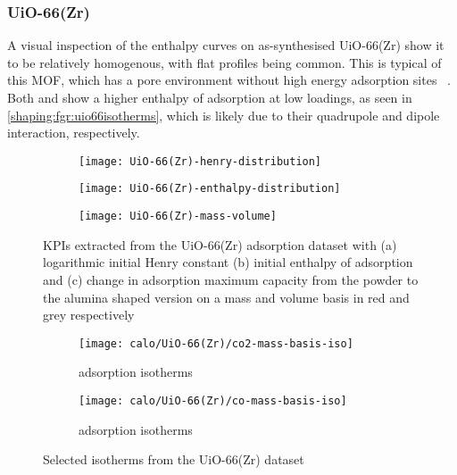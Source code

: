 
\subsubsection{UiO-66(Zr)}

A visual inspection of the enthalpy curves on as-synthesised UiO-66(Zr)
show it to be relatively homogenous, with flat
profiles being common. This is typical of this MOF, which has
a pore environment without high energy adsorption sites
~\cite{wiersumEvaluationUiO66GasBased2011}.
Both  and  show a higher enthalpy of adsorption
at low loadings, as seen in \autoref{shaping:fgr:uio66isotherms},
which is likely due to their quadrupole and dipole interaction,
respectively.

\begin{figure}[p!]
	\centering
	\begin{subfigure}{\linewidth}
		\parbox[c]{0.1\linewidth}{\caption{}%
			\label{shaping:fgr:analysisuio66henry}}%
		\parbox[b]{0.8\linewidth}{%
			\texttt{[image: UiO-66(Zr)-henry-distribution]}%
		}%
	\end{subfigure}

	\begin{subfigure}{\linewidth}
		\parbox[c]{0.1\linewidth}{\caption{}%
			\label{shaping:fgr:analysisuio66enth}}%
		\parbox[b]{0.8\linewidth}{%
			\texttt{[image: UiO-66(Zr)-enthalpy-distribution]}%
		}%
	\end{subfigure}

	\begin{subfigure}{\linewidth}
		\parbox[c]{0.1\linewidth}{\caption{}%
			\label{shaping:fgr:analysisuio66basis}}%
		\parbox[b]{0.8\linewidth}{%
			\texttt{[image: UiO-66(Zr)-mass-volume]}%
		}%
	\end{subfigure}

	\caption{KPIs extracted from the UiO-66(Zr) adsorption dataset with
		(a) logarithmic initial Henry constant (b) initial enthalpy of
        adsorption and (c) change in adsorption maximum capacity from 
        the powder to the alumina shaped version on a mass and volume 
        basis in red and grey respectively}%
	\label{shaping:fgr:analysisuio66}
\end{figure}

\begin{figure}[htb]
	\centering
	\begin{subfigure}{0.45\textwidth}
		\texttt{[image: calo/UiO-66(Zr)/co2-mass-basis-iso]}
		\caption{ adsorption isotherms}%
		\label{shaping:fgr:uio66co2ads}
	\end{subfigure}
	\begin{subfigure}{0.45\textwidth}
		\texttt{[image: calo/UiO-66(Zr)/co-mass-basis-iso]}
		\caption{ adsorption isotherms}%
		\label{shaping:fgr:uio66coads}
	\end{subfigure}%
	\caption{Selected isotherms from the UiO-66(Zr) dataset}%
	\label{shaping:fgr:uio66isotherms}
\end{figure}

